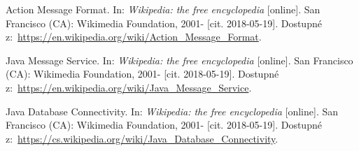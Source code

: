 \documentclass[a4paper,12pt]{article}
\begin{document}
{  Action Message Format. In: \textit{Wikipedia: the free encyclopedia} [online]. San Francisco (CA): Wikimedia Foundation, 2001- [cit. 2018-05-19]. Dostupné z:~\url{https://en.wikipedia.org/wiki/Action_Message_Format}.
  
  Java Message Service. In: \textit{Wikipedia: the free encyclopedia} [online]. San Francisco (CA): Wikimedia Foundation, 2001- [cit. 2018-05-19]. Dostupné z:~\url{https://en.wikipedia.org/wiki/Java_Message_Service}.
  
  Java Database Connectivity. In: \textit{Wikipedia: the free encyclopedia} [online]. San Francisco (CA): Wikimedia Foundation, 2001- [cit. 2018-05-19]. Dostupné z:~\url{https://cs.wikipedia.org/wiki/Java_Database_Connectivity}.
  
}





\seznamobr  %


\seznamtab  %




\end{document}
